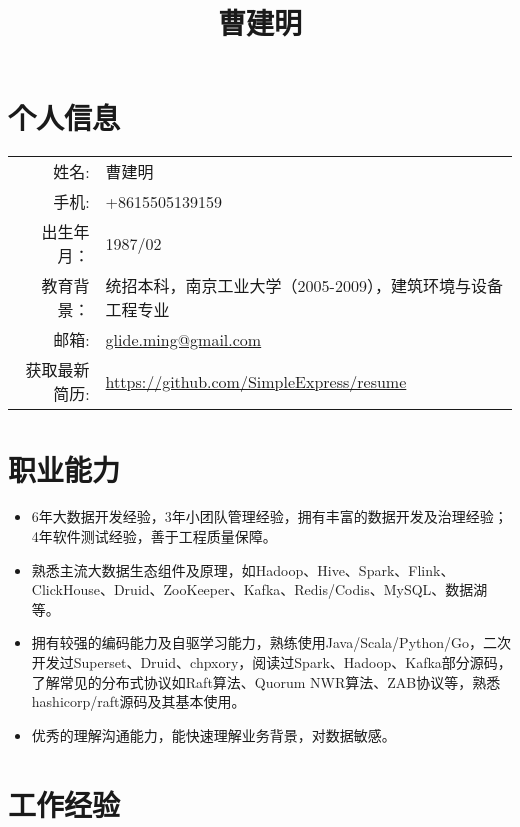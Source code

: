 \documentclass{ctexart}
\author{}
\title{\vspace{-1cm}曹建明}
\date{}
\begin{document}


\section*{个人信息}

\noindent\begin{tabular}{rl}
姓名: & 曹建明\\
手机: & +8615505139159\\
出生年月：& 1987/02\\
教育背景：& 统招本科，南京工业大学（2005-2009），建筑环境与设备工程专业\\
邮箱: & \href{mailto:glide.ming@gmail.com}{glide.ming@gmail.com}\\
获取最新简历: & \href{https://github.com/SimpleExpress/resume/blob/master/CJM_CN.tex}{https://github.com/SimpleExpress/resume}
\end{tabular}

\section*{职业能力}

\begin{itemize}
\item 6年大数据开发经验，3年小团队管理经验，拥有丰富的数据开发及治理经验；4年软件测试经验，善于工程质量保障。
\item 熟悉主流大数据生态组件及原理，如Hadoop、Hive、Spark、Flink、ClickHouse、Druid、ZooKeeper、Kafka、Redis/Codis、MySQL、数据湖	等。
\item 拥有较强的编码能力及自驱学习能力，熟练使用Java/Scala/Python/Go，二次开发过Superset、Druid、chpxory，阅读过Spark、Hadoop、Kafka部分源码，了解常见的分布式协议如Raft算法、Quorum NWR算法、ZAB协议等，熟悉hashicorp/raft源码及其基本使用。
\item 优秀的理解沟通能力，能快速理解业务背景，对数据敏感。
\end{itemize}

\section*{工作经验}
\end{document}
